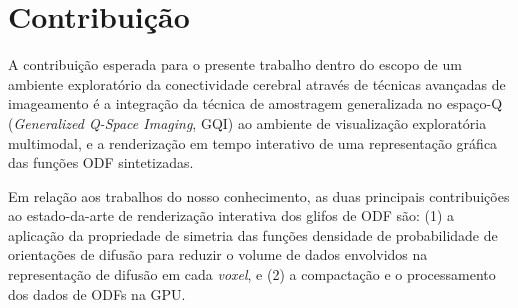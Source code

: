 \documentclass[
    12pt,                %
    oneside,            %
    a4paper,            %
    english,            %
    french,                %
    spanish,            %
    brazil                %
    ]{abntex2}
\begin{document}













\section{Contribuição}
\label{sec:contribuicoes}

A contribuição esperada para o presente trabalho dentro do escopo de um ambiente exploratório da conectividade cerebral através de técnicas avançadas de imageamento é a integração da técnica de amostragem generalizada no espaço-Q (\textit{Generalized Q-Space Imaging}, GQI) \cite{yeh2010}  ao ambiente de visualização exploratória multimodal, e a renderização em tempo interativo de uma representação gráfica das funções ODF sintetizadas.

Em relação aos trabalhos do nosso conhecimento, as duas principais contribuições ao estado-da-arte de renderização interativa dos glifos de ODF são: (1) a aplicação da propriedade de simetria das funções densidade de probabilidade de orientações de difusão para reduzir o volume de dados envolvidos na representação de difusão em cada \textit{voxel}, e (2) a compactação e o processamento dos dados de ODFs na GPU.
\end{document}
